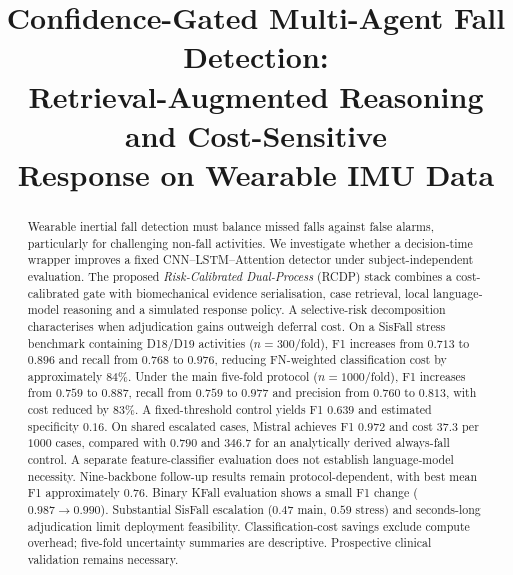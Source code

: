 \documentclass[journal]{IEEEtran}
\begin{document}
\title{Confidence-Gated Multi-Agent Fall Detection:\\
Retrieval-Augmented Reasoning and Cost-Sensitive\\
Response on Wearable IMU Data}

\author{%
}

\maketitle

\begin{abstract}
Wearable inertial fall detection must balance missed falls against false alarms, particularly for challenging non-fall activities. We investigate whether a decision-time wrapper improves a fixed CNN--LSTM--Attention detector under subject-independent evaluation. The proposed \emph{Risk-Calibrated Dual-Process} (RCDP) stack combines a cost-calibrated gate with biomechanical evidence serialisation, case retrieval, local language-model reasoning and a simulated response policy. A selective-risk decomposition characterises when adjudication gains outweigh deferral cost. On a SisFall stress benchmark containing D18/D19 activities ($n{=}300$/fold), F1 increases from $0.713$ to $0.896$ and recall from $0.768$ to $0.976$, reducing FN-weighted classification cost by approximately $84\%$. Under the main five-fold protocol ($n{=}1000$/fold), F1 increases from $0.759$ to $0.887$, recall from $0.759$ to $0.977$ and precision from $0.760$ to $0.813$, with cost reduced by $83\%$. A fixed-threshold control yields F1 $0.639$ and estimated specificity $0.16$. On shared escalated cases, Mistral achieves F1 $0.972$ and cost $37.3$ per $1000$ cases, compared with $0.790$ and $346.7$ for an analytically derived always-fall control. A separate feature-classifier evaluation does not establish language-model necessity. Nine-backbone follow-up results remain protocol-dependent, with best mean F1 approximately $0.76$. Binary KFall evaluation shows a small F1 change ($0.987{\rightarrow}0.990$). Substantial SisFall escalation ($0.47$ main, $0.59$ stress) and seconds-long adjudication limit deployment feasibility. Classification-cost savings exclude compute overhead; five-fold uncertainty summaries are descriptive. Prospective clinical validation remains necessary.
\end{abstract}
\end{document}
